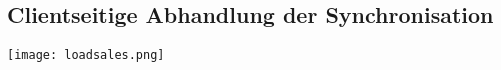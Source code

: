 \subsection{Clientseitige Abhandlung der Synchronisation}
\label{app:loadsales}
\begin{center}
\texttt{[image: loadsales.png]}
\end{center}